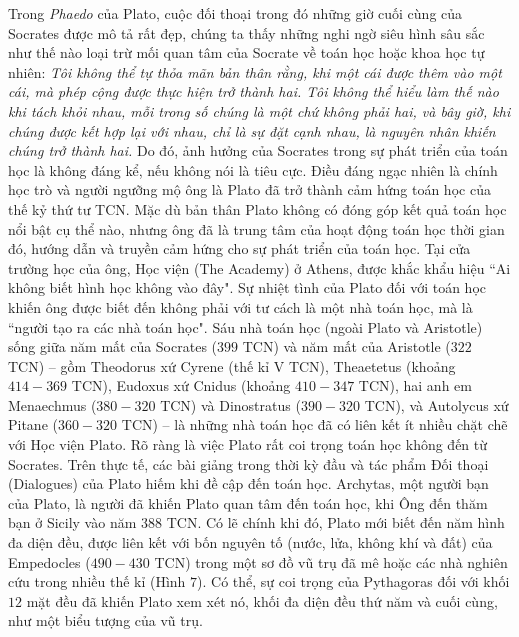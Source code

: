 	\begin{multicols}{2}
	Trong \textit{Phaedo} của Plato, cuộc đối thoại trong đó những giờ cuối cùng của Socrates được mô tả rất đẹp, chúng ta thấy những nghi ngờ siêu hình sâu sắc như thế nào loại trừ mối quan tâm của Socrate về toán học hoặc khoa học tự nhiên:
	\vskip 0.1cm
	\textit{Tôi không thể tự thỏa mãn bản thân rằng, khi một cái được thêm vào một cái, mà phép cộng được thực hiện trở thành hai. 
	\vskip 0.1cm
	Tôi không thể hiểu làm thế nào khi tách khỏi nhau, mỗi trong số chúng là một chứ không phải hai, và bây giờ, khi chúng được kết hợp lại với nhau, chỉ là sự đặt cạnh nhau, là nguyên nhân khiến chúng trở thành hai.}
	\vskip 0.1cm
	Do đó, ảnh hưởng của Socrates trong sự phát triển của toán học là không đáng kể, nếu không nói là tiêu cực. Điều đáng ngạc nhiên là chính học trò và người ngưỡng mộ ông là Plato đã trở thành cảm hứng toán học của thế kỷ thứ tư TCN. 
	\vskip 0.1cm
	Mặc dù bản thân Plato không có đóng góp kết quả toán học nổi bật cụ thể nào, nhưng ông đã là trung tâm của hoạt động toán học thời gian đó, hướng dẫn và truyền cảm hứng cho sự phát triển của toán học. Tại cửa trường học của ông, Học viện (The Academy) ở Athens, được khắc khẩu hiệu ``Ai không biết hình học không vào đây".
	\vskip 0.1cm
	\vskip 0.1cm
	Sự nhiệt tình của Plato đối với toán học khiến ông được biết đến không phải với tư cách là một nhà toán học, mà là ``người tạo ra các nhà toán học".
	\vskip 0.1cm
	Sáu nhà toán học (ngoài Plato và Aristotle) sống giữa năm mất của Socrates ($399$ TCN) và năm mất của Aristotle ($322$ TCN) -- gồm Theodorus xứ Cyrene (thế kỉ V TCN), Theaetetus (khoảng $414-369$ TCN), Eudoxus xứ Cnidus (khoảng $410-347$ TCN), hai anh em Menaechmus ($380-320$ TCN) và Dinostratus ($390-320$  TCN), và Autolycus xứ Pitane ($360-320$ TCN) -- là những nhà toán học đã có liên kết ít nhiều chặt chẽ với Học viện Plato.
	\vskip 0.1cm
	Rõ ràng là việc Plato rất coi trọng toán học không đến từ Socrates. Trên thực tế, các bài giảng trong thời kỳ đầu và tác phẩm Đối thoại (Dialogues) của Plato hiếm khi đề cập đến toán học. Archytas, một người bạn của Plato, là người đã khiến Plato quan tâm đến toán học, khi Ông đến thăm bạn ở Sicily vào năm $388$ TCN. Có lẽ chính khi đó, Plato mới biết đến năm hình đa diện đều, được liên kết với bốn nguyên tố (nước, lửa, không khí và đất) của Empedocles ($490-430$ TCN) trong một sơ đồ vũ trụ đã mê hoặc các nhà nghiên cứu trong nhiều thế kỉ (Hình $7$). 
	\vskip 0.1cm
	Có thể, sự coi trọng của Pythagoras đối với khối $12$ mặt đều đã khiến Plato xem xét nó, khối đa diện đều thứ năm và cuối cùng, như một biểu tượng của vũ trụ. 

\end{multicols}
